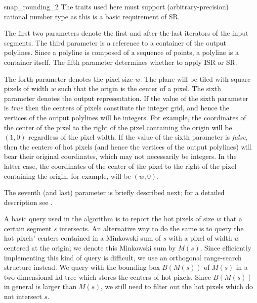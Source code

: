 \begin{ccRefFunction}{snap_rounding_2}
The traits used here must support (arbitrary-precision) rational number type as
this is a basic requirement of SR.



The first two parameters denote the first and after-the-last iterators
of the input segments.  The third parameter is a reference to a
container of the output polylines. Since a polyline is composed of a
sequence of points, a polyline is a container itself.  The fifth
parameter determines whether to apply ISR or SR.

The forth parameter denotes the pixel size $w$. The plane will be
tiled with square pixels of width $w$ such that the origin is the
center of a pixel. The sixth parameter denotes the output
representation. If the value of the sixth parameter is {\it true\/}
then the centers of pixels constitute the integer grid, and hence the
vertices of the output polylines will be integers. For example, the
coordinates of the center of the pixel to the right of the pixel
containing the origin will be $(1,0)$ regardless of the pixel width.
If the value of the sixth parameter is {\it false\/}, then the centers
of hot pixels (and hence the vertices of the output polylines) will
bear their original coordinates, which may not necessarily be
integers. In the latter case, the coordinates of the center of the
pixel to the right of the pixel containing the origin, for example,
will be $(w,0)$.

The seventh (and last) parameter is briefly described next; for a
detailed description see \cite{cgal:hp-isr-02}.

\begin{ccAdvanced}

 A basic query used in the algorithm is to report the hot pixels of
 size $w$ that a certain segment $s$ intersects.  An alternative way to
 do the same is to query the hot pixels' centers contained in a
 Minkowski sum of $s$ with a pixel of width $w$ centered at the origin;
 we denote this Minkowski sum by $M(s)$. Since efficiently implementing
 this kind of query is difficult, we use an orthogonal range-search
 structure instead. We query with the bounding box $B(M(s))$ of $M(s)$
 in a two-dimensional kd-tree which stores the centers of hot
 pixels. Since $B(M(s))$ in general is larger than $M(s)$, we still
 need to filter out the hot pixels which do not intersect $s$.


\end{ccAdvanced}
\end{ccRefFunction}
